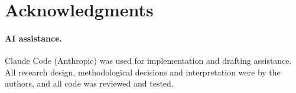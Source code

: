 \section*{Acknowledgments}

\paragraph{AI assistance.}
Claude Code (Anthropic) was used for implementation and drafting assistance.
All research design, methodological decisions and interpretation were by the authors, and all code was reviewed and tested.
